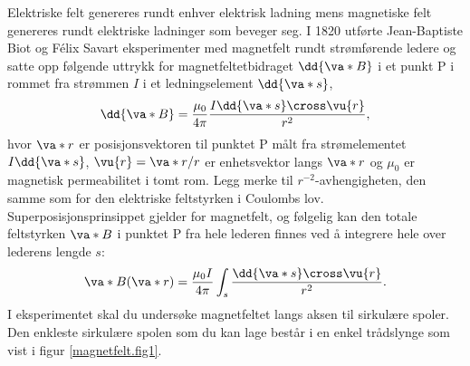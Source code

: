 \documentclass[../Elmag-labhefte-2020.tex]{subfiles}
\begin{document}
Elektriske felt genereres rundt enhver elektrisk ladning mens magnetiske felt genereres rundt elektriske ladninger som beveger seg. I 1820 utførte Jean-Baptiste Biot og Félix Savart eksperimenter med magnetfelt rundt strømførende ledere og satte opp følgende uttrykk for magnetfeltetbidraget $\dd{\va*{B}}$ i et punkt P i rommet fra strømmen $I$ i et ledningselement $\dd{\va*{s}}$,
\begin{equation}
    \dd{\va*{B}} = \frac{\mu_0}{4\pi} \frac{I \dd{\va*{s}} \cross \vu{r}}{r^2} ,
    \label{eq:Biot.Savart}
\end{equation}
hvor $\va*{r}$ er posisjonsvektoren til punktet P målt fra strømelementet $I \dd{\va*{s}}$, $\vu{r} = \va*{r}/r$ er enhetsvektor langs $\va*{r}$ og $\mu_0$ er magnetisk permeabilitet i tomt rom. Legg merke til $r^{-2}$-avhengigheten, den samme som for den elektriske feltstyrken i Coulombs lov. Superposisjonsprinsippet gjelder for magnetfelt, og følgelig kan den totale feltstyrken $\va*{B}$ i punktet P fra hele lederen finnes ved å integrere hele over lederens lengde $s$:
\begin{equation}
    \va*{B}(\va*{r}) = \frac{\mu_0 I}{4 \pi} \int_s \frac{ \dd{\va*{s}} \cross \vu{r}} {r^2} .
    \label{eq:Biot.Savart2}
\end{equation}
%
I eksperimentet skal du undersøke magnetfeltet langs aksen til sirkulære spoler. Den enkleste sirkulære spolen som du kan lage består i en enkel trådslynge som vist i figur \ref{magnetfelt.fig1}.
%
\end{document}
